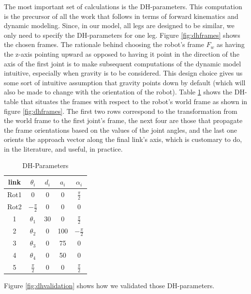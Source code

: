 The most important set of calculations is the DH-parameters. This computation is the precursor of all the work that follows in terms of forward kinematics and dynamic modeling. Since, in our model, all legs are designed to be similar, we only need to specify the DH-parameters for one leg. Figure \ref{fig:dhframes} shows the chosen frames. The rationale behind choosing the robot's frame $F_w$ as having the z-axis pointing upward as opposed to having it point in the direction of the axis of the first joint is to make subsequent computations of the dynamic model intuitive, especially when gravity is to be considered. This design choice gives us some sort of intuitive assumption that gravity points down by default (which will also be made to change with the orientation of the robot).
Table \ref{tab:dhparams} shows the DH-table that situates the frames with respect to the robot's world frame as shown in figure \ref{fig:dhframes}. The first two rows correspond to the transformation from the world frame to the first joint's frame, the next four are those that propagate the frame orientations based on the values of the joint angles, and the last one orients the approach vector along the final link's axis, which is customary to do, in the literature, and useful, in practice.

\begin{table}
\caption{DH-Parameters}
\label{tab:dhparams}
\begin{center}
\begin{tabular}{ | c | c | c | c | c |} 
\hline
link & $\theta_i$ & $d_i$ & $a_i$ & $\alpha_i$ \\
\hline
Rot1 & 0 & 0 & 0 & $\frac{\pi}{2}$ \\
\hline
Rot2 & $-\frac{\pi}{2}$ & 0 & 0 & 0 \\
\hline
1    & $\theta_1$ & 30  & 0  & $\frac{\pi}{2}$  \\
\hline
2    & $\theta_2$  & 0  & 100 & $-\frac{\pi}{2}$  \\
\hline
3    & $\theta_3$  & 0  & 75  & 0 \\
\hline
4    & $\theta_4$  & 0  & 50  & 0 \\
\hline
5    & $\frac{\pi}{2}$  & 0  & 0  &  $\frac{\pi}{2}$ \\
\hline
\end{tabular}
\end{center}
\end{table}

Figure \ref{fig:dhvalidation} shows how we validated those DH-parameters.

